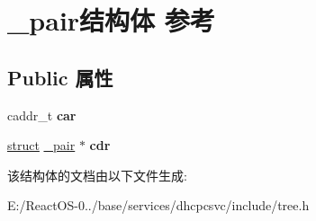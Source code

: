 \hypertarget{struct__pair}{}\section{\+\_\+pair结构体 参考}
\label{struct__pair}
\subsection*{Public 属性}
\begin{DoxyCompactItemize}
\item 
\mbox{\label{struct__pair_a805cb7a6d435ceca2cab0f208d456c7a}} 
caddr\+\_\+t {\bfseries car}
\item 
\mbox{\label{struct__pair_a0bfea8d77c95363b4aea7b519e28acdf}} 
\hyperlink{interfacestruct}{struct} \hyperlink{struct__pair}{\+\_\+pair} $\ast$ {\bfseries cdr}
\end{DoxyCompactItemize}


该结构体的文档由以下文件生成\+:\begin{DoxyCompactItemize}
\item 
E\+:/\+React\+O\+S-\/0../base/services/dhcpcsvc/include/tree.\+h\end{DoxyCompactItemize}
